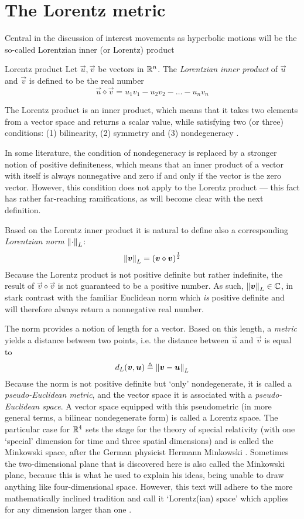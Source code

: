 \section{The Lorentz metric}
\label{sec:lorentz_metric}
Central in the discussion of interest movements as hyperbolic motions will be the so-called Lorentzian inner (or Lorentz) product

\begin{block}{Lorentz product}
    Let \(\vec{u}, \vec{v}\) be vectors in \(\mathbb{R}^n\). The \emph{Lorentzian inner product} of \(\vec{u}\) and \(\vec{v}\) is defined to be the real number
    \[
     \vec{u} \diamond \vec{v} = u_1v_1 - u_2v_2 - \ldots - u_nv_n
\]
\end{block}
The Lorentz product is an inner product, which means that it takes two elements from a vector space and returns a scalar value, while satisfying two (or three) conditions: (1) bilinearity, (2) symmetry and (3) nondegeneracy \cite{Ratcliffe2019}.

In some literature, the condition of nondegeneracy is replaced by a stronger notion of positive definiteness, which means that an inner product of a vector with itself is always nonnegative and zero if and only if the vector is the zero vector. However, this condition does not apply to the Lorentz product --- this fact has rather far-reaching ramifications, as will become clear with the next definition. 

Based on the Lorentz inner product it is natural to define also a corresponding \emph{Lorentzian norm} \(\norm{\cdot}_L\):
    \[
     \norm{\vb*{v}}_L = \qty(\vb*{v}\diamond\vb*{v})^\frac{1}{2}
\]
Because the Lorentz product is not positive definite but rather indefinite, the result of \(\vec{v}\diamond\vec{v}\) is not guaranteed to be a positive number. As such, \(\norm{\vb*{v}}_L \in \mathbb{C}\), in stark contrast with the familiar Euclidean norm which \emph{is} positive definite and will therefore always return a nonnegative real number.

The norm provides a notion of length for a vector. Based on this length, a \emph{metric} yields a distance between two points, i.e. the distance between \(\vec{u}\) and \(\vec{v}\) is equal to 
\[
     d_L(\vb*{v}, \vb*{u}) \triangleq \norm{\vb*{v} - \vb*{u}}_L
\] 
Because the norm is not positive definite but `only' nondegenerate, it is called a \emph{pseudo-Euclidean metric}, and the vector space it is associated with a \emph{pseudo-Euclidean space}. A vector space equipped with this pseudometric (in more general terms, a bilinear nondegenerate form) is called a Lorentz space. The particular case for \(\mathbb{R}^4\) sets the stage for the theory of special relativity (with one `special' dimension for time and three spatial dimensions) and is called the Minkowski space, after the German physicist Hermann Minkowski \cite{Catoni2008}. Sometimes the two-dimensional plane that is discovered here is also called the Minkowski plane, because this is what he used to explain his ideas, being unable to draw anything like four-dimensional space. However, this text will adhere to the more mathematically inclined tradition and call it `Lorentz(ian) space' which applies for any dimension larger than one \cite{Ratcliffe2019}. 

